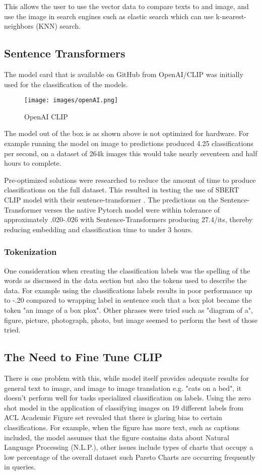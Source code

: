 \documentclass[letterpaper, 10 pt, conference]{ieeeconf}  %
\begin{document}
This allows the user to use the vector data to compare texts to and image, and use the image in search engines such as elastic search which can use  k-nearest-neighbors (KNN) search. 

\subsection{Sentence Transformers}
The model card that is available on GitHub from OpenAI/CLIP was initially used for the classification of the models.

\begin{figure}
    \centering
    \texttt{[image: images/openAI.png]}
    \caption{OpenAI CLIP \cite{OpenAI}}
    \label{fig:openAI-clip}
\end{figure}

The model out of the box is as shown above is not optimized for hardware. For example running the model on image to predictions produced 4.25 classifications per second, on a dataset of 264k images this would take nearly seventeen and half hours to complete. 

Pre-optimized solutions were researched to reduce the amount of time to produce classifications on the full dataset. This resulted in testing the use of SBERT CLIP model with their sentence-transformer \cite{SBERT}.
The predictions on the Sentence-Transformer verses the native Pytorch model were within
tolerance of approximately .020-.026 with Sentence-Transformers producing 27.4/its, thereby reducing embedding
and classification time to under 3 hours.

\subsubsection{Tokenization}
One consideration when creating the classification labels was the spelling of the words as discussed in the data section but also the tokens used to describe the data. For example using the classifications labels results in poor performance up to -.20 compared to wrapping 
label in sentence such that a box plot became the token "an image of a box plox". Other phrases were tried such as "diagram of a", figure, picture, photograph, photo, but image 
seemed to perform the best of those tried. 

\subsection{The Need to Fine Tune CLIP}
There is one problem with this, while model itself provides adequate results for general text to image, and image to image translation e.g. "cats on a bed", it doesn't perform well for tasks specialized classification on labels.
Using the zero shot model in the application of classifying images on 19 different labels from ACL Academic Figure set revealed that there is glaring bias to certain classifications. For example, when the figure has more text, such as captions included, the model assumes that the figure contains data about Natural Language Processing (N.L.P.), other issues include types of charts that occupy
a low percentage of the overall dataset such Pareto Charts are occurring frequently in queries. 
\end{document}
